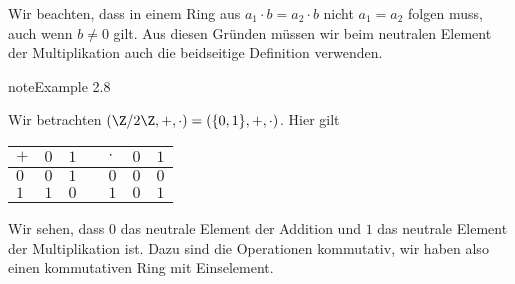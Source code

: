 \documentclass[letterpaper,10pt,english]{jupyterBook}
\begin{document}
Wir beachten, dass in einem Ring aus \(a_1 \cdot b = a_2 \cdot b\) nicht \(a_1=a_2\) folgen muss, auch wenn \(b\neq 0\) gilt. Aus diesen Gründen müssen wir beim neutralen Element der Multiplikation auch die beidseitige Definition verwenden.
\label{grundlagen/zahlensysteme:example-7}
\begin{sphinxadmonition}{note}{Example 2.8}



Wir betrachten \((\Z/2\Z, +,\cdot)=(\{0,1\},+,\cdot)\). Hier gilt


\begin{savenotes}\sphinxattablestart
\centering
\begin{tabulary}{\linewidth}[t]{|T|T|T|T|T|T|T|}
\hline
\sphinxstyletheadfamily 
\(+\)
&\sphinxstyletheadfamily 
\(0\)
&\sphinxstyletheadfamily 
\(1\)
&

&\sphinxstyletheadfamily 
\(\cdot\)
&\sphinxstyletheadfamily 
\(0\)
&\sphinxstyletheadfamily 
\(1\)
\\
\hline
\(0\)
&
\(0\)
&
\(1\)
&

&
\(0\)
&
\(0\)
&
\(0\)
\\
\hline
\(1\)
&
\(1\)
&
\(0\)
&

&
\(1\)
&
\(0\)
&
\(1\)
\\
\hline
\end{tabulary}
\par
\sphinxattableend\end{savenotes}

Wir sehen, dass \(0\) das neutrale Element der Addition und \(1\) das neutrale Element der Multiplikation ist. Dazu sind die Operationen kommutativ, wir haben also einen kommutativen Ring mit Einselement.
\end{sphinxadmonition}
\label{grundlagen/zahlensysteme:example-8}
\end{document}
